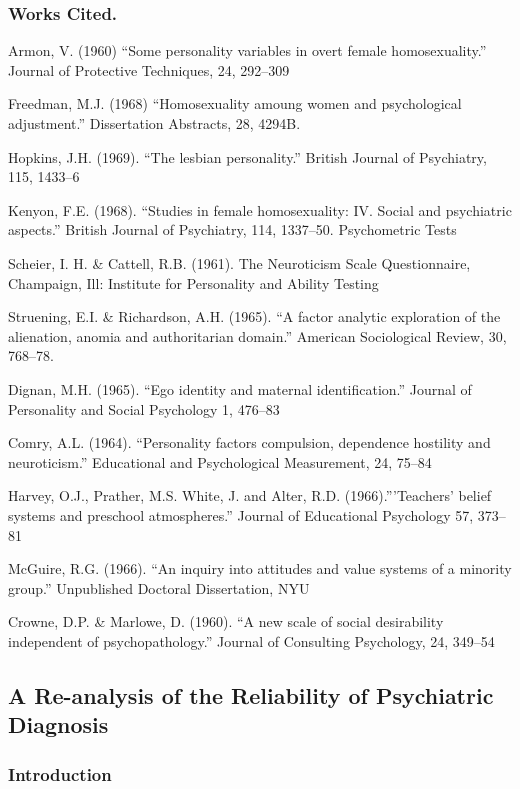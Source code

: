 \begin{refsection}
\subsubsection{Works Cited.}
\label{workscited.}

Armon, V. (1960) “Some personality variables in overt female homosexuality.” Journal of Protective Techniques, 24, 292--309

Freedman, M.J. (1968) “Homosexuality amoung women and psychological adjustment.” Dissertation Abstracts, 28, 4294B.

Hopkins, J.H. (1969). “The lesbian personality.” British Journal of Psychiatry, 115, 1433--6

Kenyon, F.E. (1968). “Studies in female homosexuality: IV. Social and psychiatric aspects.” British Journal of Psychiatry, 114, 1337--50.
Psychometric Tests

Scheier, I. H. \& Cattell, R.B. (1961). The Neuroticism Scale Questionnaire, Champaign, Ill: Institute for Personality and Ability Testing

Struening, E.I. \& Richardson, A.H. (1965). “A factor analytic exploration of the alienation, anomia and authoritarian domain.” American Sociological Review, 30, 768--78.

Dignan, M.H. (1965). “Ego identity and maternal identification.” Journal of Personality and Social Psychology 1, 476--83

Comry, A.L. (1964). “Personality factors compulsion, dependence hostility and neuroticism.” Educational and Psychological Measurement, 24, 75--84

Harvey, O.J., Prather, M.S. White, J. and Alter, R.D. (1966).”'Teachers' belief systems and preschool atmospheres.” Journal of Educational Psychology 57, 373--81

McGuire, R.G. (1966). “An inquiry into attitudes and value systems of a minority group.” Unpublished Doctoral Dissertation, NYU

Crowne, D.P. \& Marlowe, D. (1960). “A new scale of social desirability independent of psychopathology.” Journal of Consulting Psychology, 24, 349--54

\newpage

\subsection{A Re-analysis of the Reliability of Psychiatric Diagnosis}
\label{are-analysisofthereliabilityofpsychiatricdiagnosis}

\subsubsection{Introduction}
\label{introduction}


\end{refsection}
